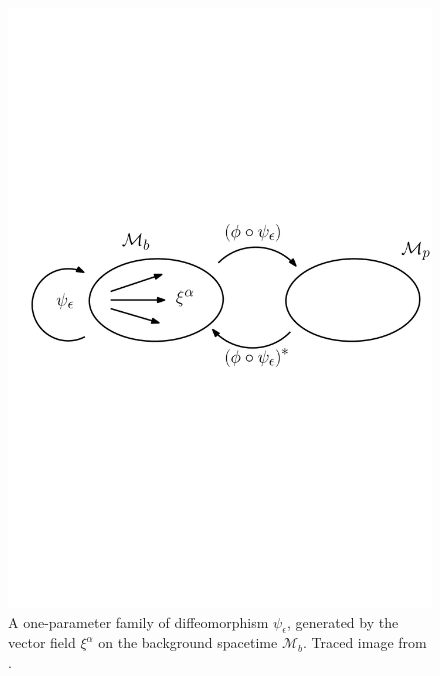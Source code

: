 \begin{figure}[h]
\centering{}\includegraphics[scale=0.5]{Kap3/ediff.pdf}\caption{A one-parameter family of diffeomorphism $\psi_{\epsilon}$, generated
by the vector field $\xi^{\alpha}$ on the background spacetime $\mathcal{M}_{b}$.  Traced image from \cite{CARROLL}.\label{fig:ediff}}
\end{figure}

